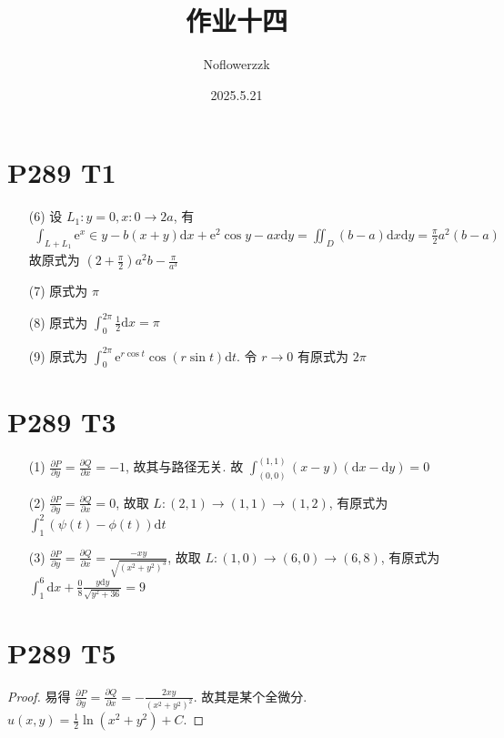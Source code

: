 \documentclass{article}
\title{作业十四}
\author{Noflowerzzk}
\date{2025.5.21}
\newcommand{\dd}{\mathrm{d}}
\newcommand{\ee}{\mathrm{e}}
\begin{document}
\maketitle

\section*{P289 T1}

\begin{itemize}
    \item [(6)] 设 $L_1: y = 0, x: 0 \rightarrow 2a$, 有
    \begin{align*}
        \int_{L + L_1}\ee^x\in y - b(x + y) \dd x + \ee^2\cos y - ax \dd y = \iint_D (b - a)\dd x \dd y = \frac{\pi}{2} a^2(b - a)
    \end{align*}
    故原式为 $\left(2 + \frac{\pi}{2}\right)a^2b - \frac{\pi}{a^3}$
    \item [(7)]
    原式为 $\pi$
    \item [(8)] 原式为 $\int_{0}^{2\pi}\frac{1}{2}\dd x = \pi$
    \item [(9)] 原式为 $\int_{0}^{2\pi}\ee^{r\cos t}\cos (r\sin t)\dd t$. 令 $r \to 0$ 有原式为 $2\pi$
\end{itemize}

\section*{P289 T3}

\begin{itemize}
    \item [(1)] $\frac{\partial P}{\partial y} = \frac{\partial Q}{\partial x} = -1$, 故其与路径无关. 故 $\int_{(0, 0)}^{(1, 1)}(x - y)(\dd x - \dd y) = 0$
    \item [(2)] $\frac{\partial P}{\partial y} = \frac{\partial Q}{\partial x} = 0$, 故取 $L: (2, 1) \to (1, 1) \to (1, 2)$, 有原式为 $\int_{1}^{2}(\psi(t) - \phi(t))\dd t$
    \item [(3)] $\frac{\partial P}{\partial y} = \frac{\partial Q}{\partial x} = \frac{-xy}{\sqrt{\left(x^2 + y^2\right)^3}}$, 故取 $L: (1, 0) \to (6, 0) \to (6, 8)$, 有原式为 $\int_{1}^{6}\dd x + \frac{0}{8}\frac{y \dd y}{\sqrt{y^2 + 36}} = 9$
\end{itemize}

\section*{P289 T5}

\begin{proof}
    易得 $\frac{\partial P}{\partial y} = \frac{\partial Q}{\partial x} = -\frac{2xy}{\left(x^2 + y^2\right)^2}$. 故其是某个全微分. $u(x, y) = \frac{1}{2}\ln \left(x^2 + y^2\right) + C$.
\end{proof}
\end{document}
